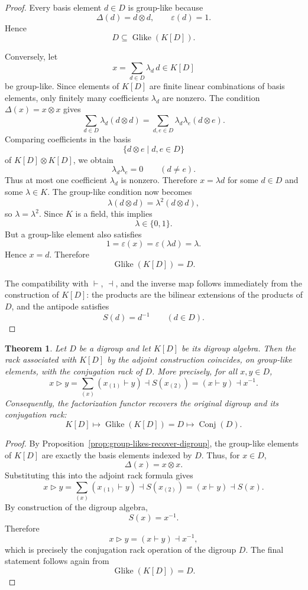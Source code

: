 \documentclass[11pt]{article}
\theoremstyle{plain}
\newtheorem{theorem}{Theorem}[section]
\theoremstyle{definition}
\theoremstyle{remark}
\DeclareMathOperator{\Glike}{Glike}
\DeclareMathOperator{\Conj}{Conj}
\begin{document}
	\begin{proof}
		Every basis element \(d\in D\) is group-like because
		\[
		\Delta(d)=d\otimes d,
		\qquad
		\varepsilon(d)=1.
		\]
		Hence
		\[
		D\subseteq \Glike(K[D]).
		\]
		
		Conversely, let
		\[
		x=\sum_{d\in D}\lambda_d\,d\in K[D]
		\]
		be group-like. Since elements of \(K[D]\) are finite linear combinations
		of basis elements, only finitely many coefficients \(\lambda_d\) are nonzero.
		The condition \(\Delta(x)=x\otimes x\) gives
		\[
		\sum_{d\in D}\lambda_d(d\otimes d)
		=
		\sum_{d,e\in D}\lambda_d\lambda_e(d\otimes e).
		\]
		Comparing coefficients in the basis
		\[
		\{d\otimes e\mid d,e\in D\}
		\]
		of \(K[D]\otimes K[D]\), we obtain
		\[
		\lambda_d\lambda_e=0
		\qquad
		(d\neq e).
		\]
		Thus at most one coefficient \(\lambda_d\) is nonzero. Therefore
		\(x=\lambda d\) for some \(d\in D\) and some \(\lambda\in K\). The
		group-like condition now becomes
		\[
		\lambda(d\otimes d)=\lambda^2(d\otimes d),
		\]
		so \(\lambda=\lambda^2\). Since \(K\) is a field, this implies
		\[
		\lambda\in\{0,1\}.
		\]
		But a group-like element also satisfies
		\[
		1=\varepsilon(x)=\varepsilon(\lambda d)=\lambda.
		\]
		Hence \(x=d\). Therefore
		\[
		\Glike(K[D])=D.
		\]
		
		The compatibility with \(\vdash\), \(\dashv\), and the inverse map follows
		immediately from the construction of \(K[D]\): the products are the bilinear
		extensions of the products of \(D\), and the antipode satisfies
		\[
		S(d)=d^{-1}
		\qquad
		(d\in D).
		\]
	\end{proof}
	
	\begin{theorem}\label{thm:factorization-on-digroup-algebra}
		Let \(D\) be a digroup and let \(K[D]\) be its digroup algebra. Then the
		rack associated with \(K[D]\) by the adjoint construction coincides, on
		group-like elements, with the conjugation rack of \(D\). More precisely,
		for all \(x,y\in D\),
		\[
		x\triangleright y
		=
		\sum_{(x)}(x_{(1)}\vdash y)\dashv S(x_{(2)})
		=
		(x\vdash y)\dashv x^{-1}.
		\]
		Consequently, the factorization functor recovers the original digroup and
		its conjugation rack:
		\[
		K[D]
		\longmapsto
		\Glike(K[D])=D
		\longmapsto
		\Conj(D).
		\]
	\end{theorem}
	
	\begin{proof}
		By Proposition~\ref{prop:group-likes-recover-digroup}, the group-like
		elements of \(K[D]\) are exactly the basis elements indexed by \(D\).
		Thus, for \(x\in D\),
		\[
		\Delta(x)=x\otimes x.
		\]
		Substituting this into the adjoint rack formula gives
		\[
		x\triangleright y
		=
		\sum_{(x)}(x_{(1)}\vdash y)\dashv S(x_{(2)})
		=
		(x\vdash y)\dashv S(x).
		\]
		By construction of the digroup algebra,
		\[
		S(x)=x^{-1}.
		\]
		Therefore
		\[
		x\triangleright y=(x\vdash y)\dashv x^{-1},
		\]
		which is precisely the conjugation rack operation of the digroup \(D\).
		The final statement follows again from
		\[
		\Glike(K[D])=D.
		\]
	\end{proof}
	
\end{document}
